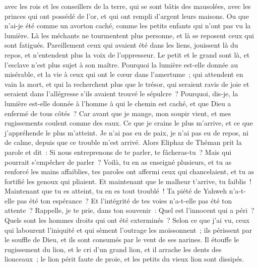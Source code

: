 \begin{multicols}{2}
avec les rois et les conseillers de la terre, qui se sont bâtis des mausolées,
avec les princes qui ont possédé de l'or, et qui ont rempli d'argent leurs maisons.
Ou que n'ai-je été comme un avorton caché, comme les petits enfants qui n'ont pas vu la lumière.
Là les méchants ne tourmentent plus personne, et là se reposent ceux qui sont fatigués. 
Pareillement ceux qui avaient été dans les liens, jouissent là du repos, et n'entendent plus la voix de l'oppresseur. 
Le petit et le grand sont là, et l'esclave n'est plus sujet à son maître.
Pourquoi la lumière est-elle donnée au misérable, et la vie à ceux qui ont le cœur dans l'amertume~;
qui attendent en vain la mort, et qui la recherchent plus que le trésor,
qui seraient ravis de joie et seraient dans l'allégresse s'ils avaient trouvé le sépulcre~?
Pourquoi, dis-je, la lumière est-elle donnée à l'homme à qui le chemin est caché, et que Dieu a enfermé de tous côtés~?
Car avant que je mange, mon soupir vient, et mes rugissements coulent comme des eaux.
Ce que je crains le plus m'arrive, et ce que j'appréhende le plus m'atteint. 
Je n'ai pas eu de paix, je n'ai pas eu de repos, ni de calme, depuis que ce trouble m'est arrivé. 
\VerseOne{}Alors Eliphaz de Théman prit la parole et dit~:
Si nous entreprenons de te parler, te fâcheras-tu~? Mais qui pourrait s'empêcher de parler~?
Voilà, tu en as enseigné plusieurs, et tu as renforcé les mains affaiblies,
tes paroles ont affermi ceux qui chancelaient, et tu as fortifié les genoux qui pliaient.
Et maintenant que le malheur t'arrive, tu faiblis~! Maintenant que tu es atteint, tu en es tout troublé~!
 Ta piété de Yahweh n'a-t-elle pas été ton espérance~? Et l'intégrité de tes voies n'a-t-elle pas été ton attente~? 
Rappelle, je te prie, dans ton souvenir~: Quel est l'innocent qui a péri~? Quels sont les hommes droits qui ont été exterminés~?
Selon ce que j'ai vu, ceux qui labourent l'iniquité et qui sèment l'outrage les moissonnent~;
ils périssent par le souffle de Dieu, et ils sont consumés par le vent de ses narines.
Il étouffe le rugissement du lion, et le cri d'un grand lion, et il arrache les dents des lionceaux~;
le lion périt faute de proie, et les petits du vieux lion sont dissipés.

\end{multicols}
